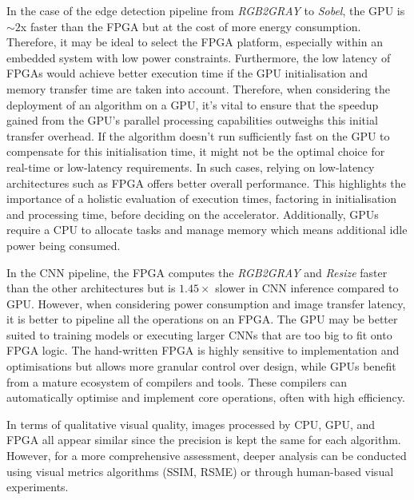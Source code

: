 In the case of the edge detection pipeline from \textit{RGB2GRAY} to \textit{Sobel}, the GPU is $\sim2$x faster than the FPGA but at the cost of more energy consumption. Therefore, it may be ideal to select the FPGA platform, especially within an embedded system with low power constraints. Furthermore, the low latency of FPGAs would achieve better execution time if the GPU initialisation and memory transfer time are taken into account. Therefore, when considering the deployment of an algorithm on a GPU, it's vital to ensure that the speedup gained from the GPU's parallel processing capabilities outweighs this initial transfer overhead. If the algorithm doesn't run sufficiently fast on the GPU to compensate for this initialisation time, it might not be the optimal choice for real-time or low-latency requirements. In such cases, relying on low-latency architectures such as FPGA offers better overall performance. This highlights the importance of a holistic evaluation of execution times, factoring in initialisation and processing time, before deciding on the accelerator. Additionally, GPUs require a CPU to allocate tasks and manage memory which means additional idle power being consumed.

In the CNN pipeline, the FPGA computes the \textit{RGB2GRAY} and \textit{Resize} faster than the other architectures but is $1.45\times$ slower in CNN inference compared to GPU. However, when considering power consumption and image transfer latency, it is better to pipeline all the operations on an FPGA. The GPU may be better suited to training models or executing larger CNNs that are too big to fit onto FPGA logic. The hand-written FPGA is highly sensitive to implementation and optimisations but allows more granular control over design, while GPUs benefit from a mature ecosystem of compilers and tools. These compilers can automatically optimise and implement core operations, often with high efficiency.

In terms of qualitative visual quality, images processed by CPU, GPU, and FPGA all appear similar since the precision is kept the same for each algorithm. However, for a more comprehensive assessment, deeper analysis can be conducted using visual metrics algorithms (\eg SSIM, RSME) or through human-based visual experiments. 

